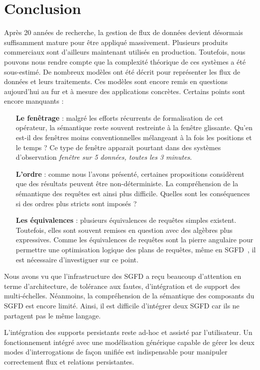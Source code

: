 \section{Conclusion}\label{sec:rw:sgfd:synthese}
Après 20 années de recherche, la gestion de flux de données devient désormais suffisamment mature pour être appliqué massivement. Plusieurs produits commerciaux sont d'ailleurs maintenant utilisés en production. Toutefois, nous pouvons nous rendre compte que la complexité théorique de ces systèmes a été sous-estimé. De nombreux modèles ont été décrit pour représenter les flux de données et leurs traitements. Ces modèles sont encore remis en questions aujourd'hui au fur et à mesure des applications concrètes. Certains points sont encore manquants :
\begin{itemize}
\item[\textbf{Le fenêtrage}] : malgré les efforts récurrents de formalisation de cet opérateur, la sémantique reste souvent restreinte à la fenêtre glissante. Qu'en est-il des fenêtres moins conventionnelles mélangeant à la fois les positions et le temps ? Ce type de fenêtre apparait pourtant dans des systèmes d'observation \textit{fenêtre sur 5 données, toutes les 3 minutes}.
\item[\textbf{L'ordre}] : comme nous l'avons présenté, certaines propositions considèrent que des résultats peuvent être non-déterministe. La compréhension de la sémantique des requêtes est ainsi plus difficile. Quelles sont les conséquences si des ordres plus stricts sont imposés ?
\item[\textbf{Les équivalences}] : plusieurs équivalences de requêtes simples existent. Toutefois, elles sont souvent remises en question avec des algèbres plus expressives. Comme les équivalences de requêtes sont la pierre angulaire pour permettre une optimisation logique des plans de requêtes, même en SGFD~\cite{Slivinskas:temporal,Arasu:stream}, il est nécessaire d'investiguer sur ce point.
\end{itemize}

Nous avons vu que l'infrastructure des SGFD a reçu beaucoup d'attention en terme d'architecture, de tolérance aux fautes, d'intégration et de support des multi-échelles. Néanmoins, la compréhension de la sémantique des composants du SGFD est encore limité. Ainsi, il est difficile d'intégrer deux SGFD car ils ne partagent pas le même langage.

L'intégration des supports persistants reste ad-hoc et assisté par l'utilisateur. Un fonctionnement intégré avec une modélisation générique capable de gérer les deux modes d'interrogations de façon unifiée est indispensable pour manipuler correctement flux et relations persistantes.


